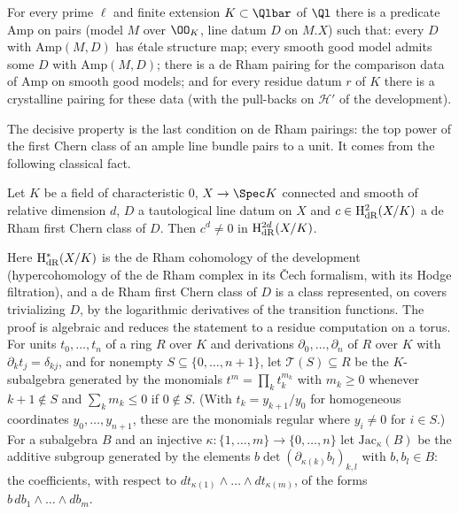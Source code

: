 \begin{theorem}\label{pf:steps1:pseam}
For every prime $\ell$ and finite extension $K\subset\Qlbar$ of $\Ql$ there is a predicate $\mathrm{Amp}$ on pairs (model
$M$ over $\OO_K$, line datum $D$ on $M.X$) such that: every $D$ with $\mathrm{Amp}(M,D)$ has \'etale structure map; every
smooth good model admits some $D$ with $\mathrm{Amp}(M,D)$; there is a de Rham pairing for the comparison data of
$\mathrm{Amp}$ on smooth good models; and for every residue datum $r$ of $K$ there is a crystalline pairing for these
data (with the pull-backs on $\mathcal H'$ of the development).
\end{theorem}

The decisive property is the last condition on de Rham pairings: the top power of the first Chern class of an ample line
bundle pairs to a unit. It comes from the following classical fact.

\begin{proposition}\label{pf:steps1:powK}
Let $K$ be a field of characteristic $0$, $X\to\Spec K$ connected and smooth of relative dimension $d$, $D$ a tautological
line datum on $X$ and $c\in\mathrm{H}^2_{\mathrm{dR}}(X/K)$ a de Rham first Chern class of $D$. Then $c^d\ne0$ in
$\mathrm{H}^{2d}_{\mathrm{dR}}(X/K)$.
\end{proposition}

Here $\mathrm{H}^*_{\mathrm{dR}}(X/K)$ is the de Rham cohomology of the development (hypercohomology of the de Rham complex in its
\v{C}ech formalism, with its Hodge filtration), and a de Rham first Chern class of $D$ is a class represented, on covers
trivializing $D$, by the logarithmic derivatives of the transition functions. The proof is algebraic and reduces the statement
to a residue computation on a torus. For units $t_0,\dots,t_n$ of a ring $R$ over $K$ and derivations $\partial_0,\dots,\partial_n$
of $R$ over $K$ with $\partial_kt_j=\delta_{kj}$, and for nonempty $S\subseteq\{0,\dots,n+1\}$, let $\mathcal T(S)\subseteq R$ be
the $K$-subalgebra generated by the monomials $t^m=\prod_kt_k^{m_k}$ with $m_k\ge0$ whenever $k+1\notin S$ and $\sum_km_k\le0$ if
$0\notin S$. (With $t_k=y_{k+1}/y_0$ for homogeneous coordinates $y_0,\dots,y_{n+1}$, these are the monomials regular where
$y_i\ne0$ for $i\in S$.) For a subalgebra $B$ and an injective $\kappa\colon\{1,\dots,m\}\to\{0,\dots,n\}$ let
$\mathrm{Jac}_\kappa(B)$ be the additive subgroup generated by the elements $b\det(\partial_{\kappa(k)}b_l)_{k,l}$ with $b,b_l\in B$:
the coefficients, with respect to $dt_{\kappa(1)}\wedge\dots\wedge dt_{\kappa(m)}$, of the forms $b\,db_1\wedge\dots\wedge db_m$.

